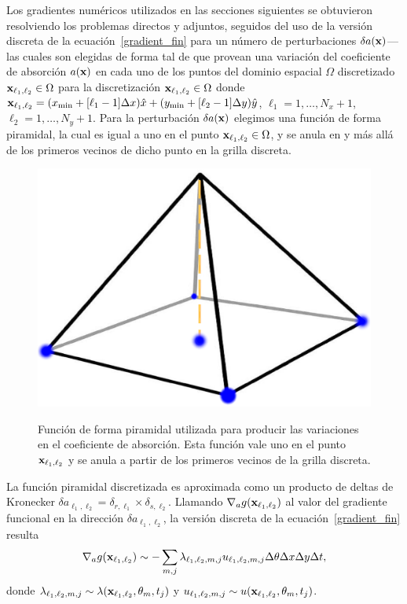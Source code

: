 Los gradientes numéricos utilizados en las secciones siguientes 
se obtuvieron resolviendo los problemas directos y adjuntos, 
seguidos del uso de la versión discreta de la ecuación~\eqref{gradient_fin} 
para un número de perturbaciones $\delta a(\mathbf{x})$---las cuales son elegidas 
de forma tal de que provean una variación del coeficiente de absorción $a(\mathbf{x})$ 
en cada uno de los puntos del dominio espacial $\Omega$ discretizado $\mathbf{x}_{\ell_1,\ell_2} \in \Omega$ 
para la discretización $\mathbf{x}_{\ell_1,\ell_2} \in \Omega$ donde 
$\mathbf{x}_{\ell_1,\ell_2} =(x_{\text{min}}+ [\ell_1-1]\Delta x)\hat x
+(y_{\text{min}}+[\ell_2-1]\Delta y)\hat y$, $\ell_1=1,\ldots,N_x+1$,
$\ell_2=1,\ldots,N_y+1$. Para la perturbación $\delta a(\mathbf{x})$ elegimos 
una función de forma piramidal, la cual es igual a uno en el punto 
 $\mathbf{x}_{\ell_1,\ell_2} \in \Omega$, y se anula en y más allá 
 de los primeros vecinos de dicho punto en la grilla discreta. 
 \begin{figure}[h!]
\centering
  \includegraphics[width=0.5\linewidth]{figuras/piramide.eps}\\
  \caption{
Función de forma piramidal utilizada para producir las variaciones 
en el coeficiente de absorción. Esta función vale uno en el punto $\mathbf{x}_{\ell_1,\ell_2}$ 
y se anula a partir de los primeros vecinos de la grilla discreta.}
 \label{fig:esquemainv}
\end{figure}
 La función piramidal discretizada es aproximada como un producto 
 de deltas de Kronecker $\delta a_{\ell_1,\ell_2}=\delta_{r,\ell_1}\times\delta_{s,\ell_2}$.
 Llamando $\nabla_a g(\mathbf{x}_{\ell_1,\ell_2})$ al valor del gradiente funcional 
 en la dirección $\delta a_{\ell_1,\ell_2}$, la versión discreta 
 de la ecuación~\eqref{gradient_fin} resulta
\begin{equation}
\nabla_a g(\mathbf{x}_{\ell_1,\ell_2})  \sim -\sum_{m,j}  \lambda_{\ell_1,\ell_2,m,j}u_{\ell_1,\ell_2,m,j} \Delta \theta \Delta x \Delta y \Delta t,
\label{eq:FDwin22}
\end{equation}
donde $\lambda_{\ell_1,\ell_2,m,j}\sim
\lambda(\mathbf{x}_{\ell_1,\ell_2},\theta_m,t_j)$ y 
$u_{\ell_1,\ell_2,m,j} \sim u(\mathbf{x}_{\ell_1,\ell_2},\theta_m,t_j)$. 
